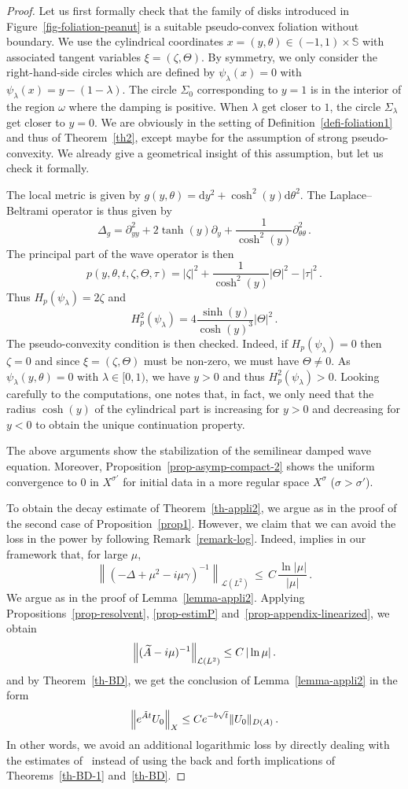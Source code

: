 \documentclass[10pt]{amsart}
\theoremstyle{definition}\newtheorem{defi}[theo]{Definition}\newtheorem{rema}[theo]{Remark}\newtheorem{exam}[theo]{Example}\newtheorem{exem}[theo]{Example}\newtheorem{nota}[theo]{Notation}
\renewcommand{\SS}{\mathbb{S}}
\newcommand{\Lc}{\mathcal{L}}
\newcommand{\drm}{\mathrm{d}}
\let\oldtilde\tilde
\renewcommand*{\tilde}[1]{\mathchoice{\widetilde{#1}}{\widetilde{#1}}{\oldtilde{#1}}{\oldtilde{#1}}}\let\oldexists\exists
\renewcommand*{\exists}{\mathrel{\oldexists}}
\begin{document}
\begin{proof}
Let us first formally check that the family of disks introduced in Figure~\ref{fig-foliation-peanut} is a suitable pseudo-convex foliation without boundary. We use the cylindrical coordinates $x=(y,\theta)\in (-1,1)\times\SS$ with associated tangent variables $\xi=(\zeta,\Theta)$. By symmetry, we only consider the right-hand-side circles which are defined by $\psi_\lambda(x)=0$ with $\psi_\lambda(x)=y-(1-\lambda)$. The circle $\Sigma_0$ corresponding to $y=1$ is in the interior of the region $\omega$ where the damping is positive. When $\lambda$ get closer to $1$, the circle $\Sigma_\lambda$ get closer to $y=0$. We are obviously in the setting of Definition~\ref{defi-foliation1} and thus of Theorem~\ref{th2}, except maybe for the assumption of strong pseudo-convexity. We already give a geometrical insight of this assumption, but let us check it formally.

The local metric is given by $g(y,\theta)=\drm y^2+\cosh^2(y)\drm\theta^2$. The Laplace--Beltrami operator is thus given by
\[
\Delta_g = \partial_{yy}^2 + 2\tanh(y)\partial_y + \frac 1
{\cosh^2(y)}\partial^2_{\theta\theta}\,.
\]
The principal part of the wave operator is then
\[
p(y,\theta,t,\zeta,\Theta,
\tau)=|\zeta|^2+\frac 1{\cosh^2(y)}|\Theta|^2-|\tau|^2\,.
\]
Thus $H_p(\psi_\lambda)=2\zeta$ and
\[
H_p^2(\psi_\lambda)=4 \frac{\sinh(y)}{\cosh(y)^3} |\Theta|^2\,.
\]
The pseudo-convexity condition is then checked. Indeed, if $H_p(\psi_\lambda)=0$ then $\zeta=0$ and since $\xi=(\zeta,\Theta)$ must be non-zero, we must have $\Theta\neq 0$. As $\psi_\lambda(y,\theta)=0$ with $\lambda\in[0,1)$, we have $y>0$ and thus $H_p^2(\psi_\lambda)>0$. Looking carefully to the computations, one notes that, in fact, we only need that the radius $\cosh(y)$ of the cylindrical part is increasing for $y>0$ and decreasing for $y<0$ to obtain the unique continuation property.

The above arguments show the stabilization of the semilinear damped wave equation. Moreover, Proposition~\ref{prop-asymp-compact-2} shows the uniform convergence to $0$ in $X^{\sigma'}$ for initial data in a more regular space $X^\sigma$ ($\sigma>\sigma'$).

To obtain the decay estimate of Theorem~\ref{th-appli2}, we argue as in the proof of the second case of Proposition~\ref{prop1}. However, we claim that we can avoid the loss in the power by following Remark~\ref{remark-log}. Indeed, \cite[Theorem~5.1]{CSVW} implies in our framework that, for large $\mu$,
\[
\left\|(-\Delta+\mu^2-i\mu\gamma)^{-1}\right\|_{\Lc(L^2)}\,\leq\,
C\,\frac{\ln|\mu|}{|\mu|}\,.
\]
We argue as in the proof of Lemma~\ref{lemma-appli2}. Applying Propositions~\ref{prop-resolvent}, \ref{prop-estimP} and~\ref{prop-appendix-linearized}, we obtain
\[
\left\|(\tilde A-i\mu)^{-1}\right\|_{\Lc(L^2)} \leq C \, {|\ln \mu|}\,.
\]
and by Theorem~\ref{th-BD}, we get the conclusion of Lemma~\ref{lemma-appli2} in the form
\[
\left\|e^{\tilde A t}U_0\right\|_X \leq Ce^{-b\sqrt{t}} \|U_0\|_{D(A)}\,.
\]
In other words, we avoid an additional logarithmic loss by directly dealing with the estimates of~\cite{CSVW} instead of using the back and forth implications of Theorems~\ref{th-BD-1} and~\ref{th-BD}.


\end{proof}
\end{document}
